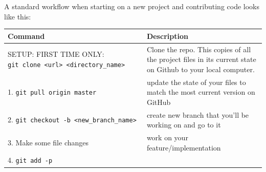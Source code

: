 \documentclass[]{book}
\begin{document}
A standard workflow when starting on a new project and contributing code
looks like this:

\begin{longtable}[]{@{}ll@{}}
\toprule
\begin{minipage}[b]{0.13\columnwidth}\raggedright\strut
Command\strut
\end{minipage} & \begin{minipage}[b]{0.22\columnwidth}\raggedright\strut
Description\strut
\end{minipage}\tabularnewline
\midrule
\endhead
\begin{minipage}[t]{0.13\columnwidth}\raggedright\strut
SETUP: FIRST TIME ONLY:
\texttt{git\ clone\ \textless{}url\textgreater{}\ \textless{}directory\_name\textgreater{}}\strut
\end{minipage} & \begin{minipage}[t]{0.22\columnwidth}\raggedright\strut
Clone the repo. This copies of all the project files in its current
state on Github to your local computer.\strut
\end{minipage}\tabularnewline
\begin{minipage}[t]{0.13\columnwidth}\raggedright\strut
1. \texttt{git\ pull\ origin\ master}\strut
\end{minipage} & \begin{minipage}[t]{0.22\columnwidth}\raggedright\strut
update the state of your files to match the most current version on
GitHub\strut
\end{minipage}\tabularnewline
\begin{minipage}[t]{0.13\columnwidth}\raggedright\strut
2.
\texttt{git\ checkout\ -b\ \textless{}new\_branch\_name\textgreater{}}\strut
\end{minipage} & \begin{minipage}[t]{0.22\columnwidth}\raggedright\strut
create new branch that you'll be working on and go to it\strut
\end{minipage}\tabularnewline
\begin{minipage}[t]{0.13\columnwidth}\raggedright\strut
3. Make some file changes\strut
\end{minipage} & \begin{minipage}[t]{0.22\columnwidth}\raggedright\strut
work on your feature/implementation\strut
\end{minipage}\tabularnewline
\begin{minipage}[t]{0.13\columnwidth}\raggedright\strut
4. \texttt{git\ add\ -p}\strut
\end{minipage} & \begin{minipage}[t]{0.22\columnwidth}\raggedright\strut

\end{minipage}
\end{longtable}
\end{document}
